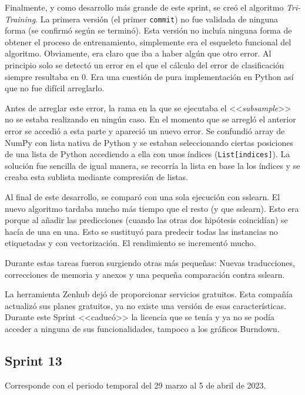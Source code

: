 Finalmente, y como desarrollo más grande de este sprint, se creó el algoritmo
\textit{Tri-Training}. La primera versión (el primer \texttt{commit}) no fue
validada de ninguna forma (se confirmó según se terminó). Esta versión no
incluía ninguna forma de obtener el proceso de entrenamiento, simplemente era el
esqueleto funcional del algoritmo. Obviamente, era claro que iba a haber algún
que otro error. Al principio solo se detectó un error en el que el cálculo del
error de clasificación siempre resultaba en 0. Era una cuestión de pura
implementación en Python así que no fue difícil arreglarlo.

Antes de arreglar este error, la rama en la que se ejecutaba el
<<\textit{subsample}>> no se estaba realizando en ningún caso. En el momento que
se arregló el anterior error se accedió a esta parte y apareció un nuevo error.
Se confundió array de NumPy con lista nativa de Python y se estaban
seleccionando ciertas posiciones de una lista de Python accediendo a ella con
unos índices (\texttt{List{[}indices{]}}). La solución fue sencilla de igual
manera, se recorría la lista en base la los índices y se creaba esta sublista
mediante compresión de listas.

Al final de este desarrollo, se comparó con una sola ejecución con sslearn. El
nuevo algoritmo tardaba mucho más tiempo que el resto (y que sslearn). Esto era
porque al añadir las predicciones (cuando las otras dos hipótesis coincidían) se
hacía de una en una. Esto se sustituyó para predecir todas las instancias no
etiquetadas y con vectorización. El rendimiento se incrementó mucho.

Durante estas tareas fueron surgiendo otras más pequeñas: Nuevas traducciones,
correcciones de memoria y anexos y una pequeña comparación contra sslearn.

\begin{tcolorbox}[colback=red!5!white,colframe=red!75!black,fontupper=\footnotesize,title=Licencia Zenhub]
La herramienta Zenhub dejó de proporcionar servicios gratuitos. Esta compañía
actualizó sus planes gratuitos, ya no existe una versión de esas
características. Durante este Sprint <<caducó>> la licencia que se tenía y ya no
se podía acceder a ninguna de sus funcionalidades, tampoco a los gráficos
Burndown.    
\end{tcolorbox}

\subsection{Sprint 13}
Corresponde con el periodo temporal del 29 marzo al 5 de abril de 2023.

